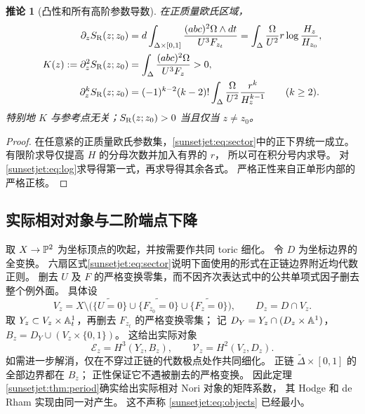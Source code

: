 \documentclass[11pt,a4paper,oneside]{ctexart}
\theoremstyle{cnplain}
\newtheorem{corollary}[theorem]{推论}
\theoremstyle{definition}
\theoremstyle{remark}
\numberwithin{equation}{section}
\begin{document}
\begin{corollary}[凸性和所有高阶参数导数]\label{sunsetjet:cor:derivatives}
在正质量欧氏区域，
\begin{align}
 \partial_zS_{\mathrm R}(z;z_0)
 &=d\int_{\Delta\times[0,1]}
             \frac{(abc)^2\Omega\wedge dt}{U^3F_{z_t}}
   =\int_\Delta\frac{\Omega}{U^2}r\log\frac{H_z}{H_{z_0}},\label{sunsetjet:eq:first}\\
 K(z):=\partial_z^2S_{\mathrm R}(z;z_0)
 &=\int_\Delta\frac{(abc)^2\Omega}{U^3F_z}>0,\label{sunsetjet:eq:second}\\
 \partial_z^kS_{\mathrm R}(z;z_0)
 &=(-1)^{k-2}(k-2)!
       \int_\Delta\frac{\Omega}{U^2}\frac{r^k}{H_z^{k-1}}\qquad(k\geq2).
                                                        \label{sunsetjet:eq:higher}
\end{align}
特别地 $K$ 与参考点无关；$S_{\mathrm R}(z;z_0)>0$ 当且仅当 $z\ne z_0$。
\end{corollary}
\begin{proof}
在任意紧的正质量欧氏参数集，\eqref{sunsetjet:eq:sector}中的正下界统一成立。
有限阶求导仅提高 $H$ 的分母次数并加入有界的 $r$，
所以可在积分号内求导。
对 \eqref{sunsetjet:eq:log}求导得第一式，再求导得其余各式。
严格正性来自正单形内部的严格正核。
\end{proof}


\subsection{实际相对对象与二阶端点下降}\label{sunsetjet:sec:motive}
取 $X\to\mathbb P^2$ 为坐标顶点的吹起，并按需要作共同 toric 细化。
令 $D$ 为坐标边界的全变换。
六扇区式\eqref{sunsetjet:eq:sector}说明下面使用的形式在正链边界附近均代数正则。
删去 $U$ 及 $F$ 的严格变换零集，而不因齐次表达式中的公共单项式因子删去整个例外面。
具体设
\[
 V_z=X\setminus\bigl(\widetilde{\{U=0\}}\cup
        \widetilde{\{F_{z_0}=0\}}\cup\widetilde{\{F_z=0\}}\bigr),
 \qquad D_z=D\cap V_z.
\]
取 $Y_z\subset V_z\times\mathbb A^1_t$，再删去 $F_{z_t}$ 的严格变换零集；
记 $D_Y=Y_z\cap(D_z\times\mathbb A^1)$，
$B_z=D_Y\cup(V_z\times\{0,1\})$。
这给出实际对象
\begin{equation}\label{sunsetjet:eq:objects}
 \mathcal E_z=H^3(Y_z,B_z),\qquad
 \mathcal V_z=H^2(V_z,D_z).
\end{equation}
如需进一步解消，仅在不穿过正链的代数极点处作共同细化。
正链 $\widetilde\Delta\times[0,1]$ 的全部边界都在 $B_z$；
正性保证它不遇被删去的严格变换。
因此定理\ref{sunsetjet:thm:period}确实给出实际相对 Nori 对象的矩阵系数，
其 Hodge 和 de Rham 实现由同一对产生。
这不声称 \eqref{sunsetjet:eq:objects} 已经最小。
\end{document}

